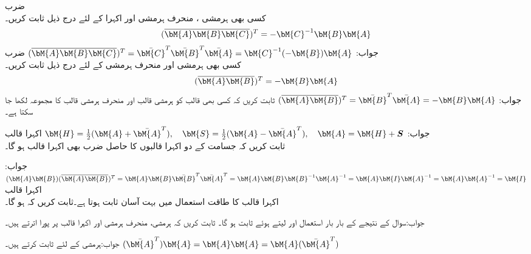 \quad ضرب\\
کسی بھی  ہرمشی ، منحرف ہرمشی  اور اکہرا  کے لئے درج ذیل ثابت کریں۔
\begin{align*}
(\overline{\bM{A}\bM{B}\bM{C}})^T=-\bM{C}^{-1}\bM{B}\bM{A}
\end{align*}
جواب:
$(\overline{\bM{A}\bM{B}\bM{C}})^T=\bar{\bM{C}}^T\bar{\bM{B}}^T\bar{\bM{A}}=\bM{C}^{-1}(-\bM{B})\bM{A}$
\quad ضرب\\
کسی بھی  ہرمشی  اور منحرف ہرمشی  کے لئے درج ذیل ثابت کریں۔
\begin{align*}
(\overline{\bM{A}\bM{B}})^T=-\bM{B}\bM{A}
\end{align*}
جواب:
$(\overline{\bM{A}\bM{B}})^T=\bar{\bM{B}}^T\bar{\bM{A}}=-\bM{B}\bM{A}$
ثابت کریں کہ کسی بھی قالب  کو ہرمشی قالب  اور منحرف ہرمشی قالب  کا مجموعہ لکھا جا سکتا ہے۔

جواب:
$\bM{H}=\tfrac{1}{2}(\bM{A}+\bar{\bM{A}}^T),\quad \bM{S}=\tfrac{1}{2}(\bM{A}-\bar{\bM{A}}^T),\quad \bM{A}=\bM{H}+\bm{S}$
\quad اکہرا قالب\\
ثابت کریں کہ  جسامت کے  دو اکہرا قالبوں کا حاصل ضرب بھی اکہرا قالب ہو گا۔ 

جواب:
$(\bM{A}\bM{B})(\overline{\bM{A}\bM{B}})^T=\bM{A}\bM{B}\bar{\bM{B}}^T\bar{\bM{A}}^T=\bM{A}\bM{B}\bM{B}^{-1}\bM{A}^{-1}=\bM{A}\bM{I}\bM{A}^{-1}=\bM{A}\bM{A}^{-1}=\bM{I}$
\quad اکہرا قالب\\
اکہرا قالب کا طاقت استعمال میں بہت آسان ثابت ہوتا ہے۔ثابت کریں کہ  ہو گا۔ 

جواب:سوال   کے نتیجے کے بار بار استعمال اور  لیتے ہوئے ثابت ہو گا۔
ثابت کریں کہ ہرمشی، منحرف ہرمشی اور اکہرا قالب  پر پورا اترتے ہیں۔

جواب:ہرمشی کے لئے ثابت کرتے ہیں۔
$(\bar{\bM{A}}^T)\bM{A}=\bM{A}\bM{A}=\bM{A}(\bar{\bM{A}}^T)$


